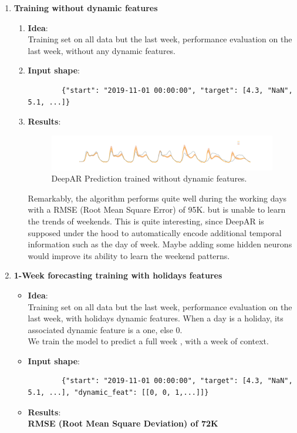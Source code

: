 \begin{enumerate}
    \item \textbf{Training without dynamic features}
    \begin{enumerate}
        \item[] \textbf{Idea}:\\
        Training set on all data but the last week, performance evaluation on the last week, without any dynamic features.
        \item[] \textbf{Input shape}: \\
        \begin{lstlisting}
        {"start": "2019-11-01 00:00:00", "target": [4.3, "NaN", 5.1, ...]}
        \end{lstlisting}

        \item[] \textbf{Results}:\\
        \begin{figure}[h!]
            \centering
            \includegraphics[width=1\textwidth]{images/deepar_no_dyn.png}
            \caption{DeepAR Prediction trained without dynamic features.}
            \description{}
            \label{fig:deepar_no_dyn}
        \end{figure}
        Remarkably, the algorithm performs quite well during the working days with a RMSE (Root Mean Square Error) of 95K. but is unable to learn the trends of weekends. This is quite interesting, since DeepAR is supposed under the hood to automatically encode additional temporal information such as the day of week. Maybe adding some hidden neurons would improve its ability to learn the weekend patterns.
    \end{enumerate}
    
    \item \textbf{1-Week forecasting training with holidays features}
    \begin{itemize}
        \item[] \textbf{Idea}:\\
        Training set on all data but the last week, performance evaluation on the last week, with holidays dynamic features. When a day is a holiday, its associated dynamic feature is a one, else 0. \\
        We train the model to predict a full week , with a week of context.
        \item[] \textbf{Input shape}:\\
        \begin{lstlisting}
        {"start": "2019-11-01 00:00:00", "target": [4.3, "NaN", 5.1, ...], "dynamic_feat": [[0, 0, 1,...]]}
        \end{lstlisting}
        \item[] \textbf{Results}:\\
        \textbf{RMSE (Root Mean Square Deviation) of 72K}
    \end{itemize}
    

\end{enumerate}
